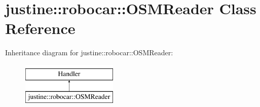 \hypertarget{classjustine_1_1robocar_1_1OSMReader}{\section{justine\-:\-:robocar\-:\-:O\-S\-M\-Reader Class Reference}
\label{classjustine_1_1robocar_1_1OSMReader}
}
Inheritance diagram for justine\-:\-:robocar\-:\-:O\-S\-M\-Reader\-:\begin{figure}[H]
\begin{center}
\leavevmode
\includegraphics[height=2.000000cm]{classjustine_1_1robocar_1_1OSMReader}
\end{center}
\end{figure}
